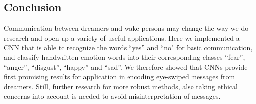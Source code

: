 \documentclass{article}
\begin{document}
\subsection*{Conclusion}

Communication between dreamers and wake persons may change the way we do research and open up a variety of useful applications. Here we implemented a CNN that is able to recognize the words “yes” and “no" for basic communication, and classify handwritten emotion-words into their corresponding classes “fear”, “anger”, “disgust”, “happy” and “sad”. We therefore showed that CNNs provide first promising results for application in encoding eye-swiped messages from dreamers. Still, further research for more robust methods, also taking ethical concerns into account is needed to avoid misinterpretation of messages.



%
%

\printbibliography[title={Bibliography}]
\end{document}
